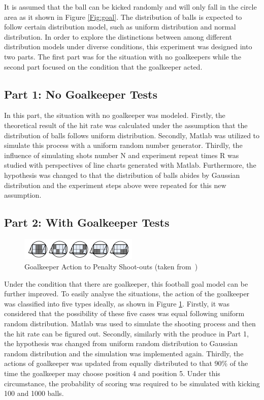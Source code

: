 \documentclass[11pt, a4paper]{article}
\begin{document}
It is assumed that the ball can be kicked randomly and will only fall in the circle area as it shown in Figure \ref{Fig:goal}. The distribution of balls is expected to follow certain distribution model, such as uniform distribution and normal distribution. In order to explore the distinctions between among different distribution models under diverse conditions, this experiment was designed into two parts. The first part was for the situation with no goalkeepers while the second part focused on the condition that the goalkeeper acted.

\subsection{Part 1: No Goalkeeper Tests}

In this part, the situation with no goalkeeper was modeled. Firstly, the theoretical result of the hit rate was calculated under the assumption that the distribution of balls follows uniform distribution. Secondly, Matlab was utilized to simulate this process with a uniform random number generator. Thirdly, the influence of simulating shots number N and experiment repeat times R was studied with perspectives of line charts generated with Matlab. Furthermore, the hypothesis was changed to that the distribution of balls abides by Gaussian distribution and the experiment steps above were repeated for this new assumption.

\subsection{Part 2: With Goalkeeper Tests}

\begin{figure}[htbp]     \begin{centering}
    \includegraphics[width=0.5\textwidth]{goalkeeper-action.png}
    \caption{Goalkeeper Action to Penalty Shoot-outs (taken from~\cite{ref:lab})}
    \label{Fig:goalkeeper-action}
    \end{centering}
\end{figure}

Under the condition that there are goalkeeper, this football goal model can be further improved. To easily analyse the situations, the action of the goalkeeper was classified into five types ideally, as shown in Figure \ref{Fig:goalkeeper-action}. Firstly, it was considered that the possibility of these five cases was equal following uniform random distribution. Matlab was used to simulate the shooting process and then the hit rate can be figured out. Secondly, similarly with the produce in Part 1, the hypothesis was changed from uniform random distribution to Gaussian random distribution and the simulation was implemented again. Thirdly, the actions of goalkeeper was updated from equally distributed to that 90\% of the time the goalkeeper may choose position 4 and position 5. Under this circumstance, the probability of scoring was required to be simulated with kicking 100 and 1000 balls.
\end{document}

